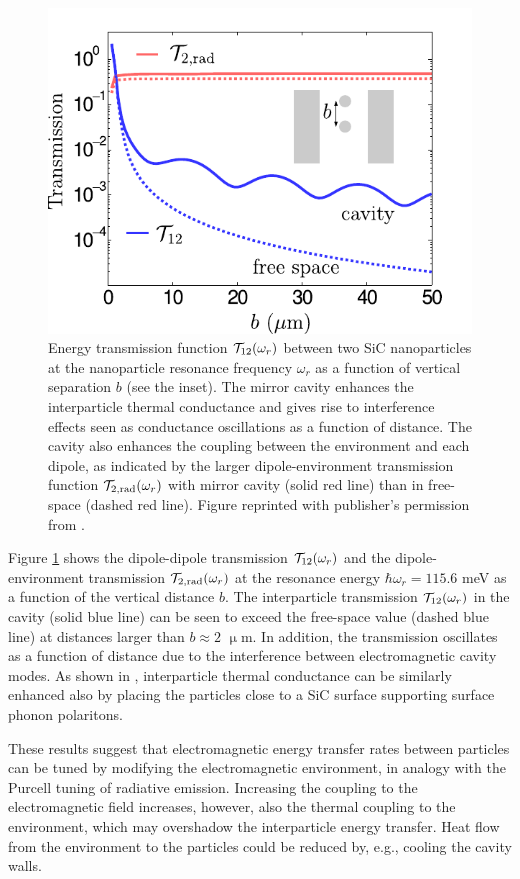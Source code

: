 \begin{figure}
 \includegraphics[width=.79\columnwidth]{pics/dipole_fig5.pdf}
 \caption{Energy transmission function $\mathcal{T}_{12}(\omega_r)$ between two SiC nanoparticles at the nanoparticle resonance frequency $\omega_r$ as a function of vertical separation $b$ (see the inset). The mirror cavity enhances the interparticle thermal conductance and gives rise to interference effects seen as conductance oscillations as a function of distance. The cavity also enhances the coupling between the environment and each dipole, as indicated by the larger dipole-environment transmission function $\mathcal{T}_{2,\textrm{rad}}(\omega_r)$ with mirror cavity (solid red line) than in free-space (dashed red line). Figure reprinted with publisher's permission from .}
\label{fig:dipole_fig5}
\end{figure}

Figure \ref{fig:dipole_fig5} shows the dipole-dipole transmission $\mathcal{T}_{12}(\omega_r)$ and the dipole-environment transmission $\mathcal{T}_{2,\textrm{rad}}(\omega_r)$ at the resonance energy $\hbar\omega_r=115.6$ meV as a function of the vertical distance $b$. The interparticle transmission $\mathcal{T}_{12}(\omega_r)$ in the cavity (solid blue line) can be seen to exceed the free-space value (dashed blue line) at distances larger than $b\approx 2$ $\upmu$m. In addition, the transmission oscillates as a function of distance due to the interference between electromagnetic cavity modes. As shown in , interparticle thermal conductance can be similarly enhanced also by placing the particles close to a SiC surface supporting surface phonon polaritons.

These results suggest that electromagnetic energy transfer rates between particles can be tuned by modifying the electromagnetic environment, in analogy with the Purcell tuning of radiative emission. Increasing the coupling to the electromagnetic field increases, however, also the thermal coupling to the environment, which may overshadow the interparticle energy transfer. Heat flow from the environment to the particles could be reduced by, e.g., cooling the cavity walls. 


